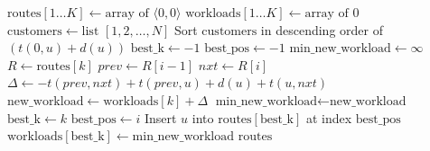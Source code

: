\documentclass[11pt]{article}
\begin{document}
\begin{algorithm}[H]
\caption{\textbf{Greedy Algorithm}}\label{alg:sorted_insertion}
\begin{algorithmic}[1]
    \State $\text{routes}[1 \dots K] \gets \text{array of } \langle 0, 0 \rangle$
    \State $\text{workloads}[1 \dots K] \gets \text{array of } 0$
    \State $\text{customers} \gets \text{list } [1, 2, \dots, N]$
    \State Sort $\text{customers}$ in descending order of $\left( t(0, u) + d(u) \right)$
        \State $\text{best\_k} \gets -1$
        \State $\text{best\_pos} \gets -1$
        \State $\text{min\_new\_workload} \gets \infty$
            $R \gets \text{routes}[k]$
                \State $prev \gets R[i-1]$
                \State $nxt \gets R[i]$
                \State $\Delta \gets - t(prev, nxt) + t(prev, u) + d(u) + t(u, nxt)$
                \State $\text{new\_workload} \gets \text{workloads}[k] + \Delta$
                    \State $\text{min\_new\_workload} \gets \text{new\_workload}$
                    \State $\text{best\_k} \gets k$
                    \State $\text{best\_pos} \gets i$
                \EndIf
            \EndFor
        \EndFor
        \State Insert $u$ into $\text{routes}[\text{best\_k}]$ at index $\text{best\_pos}$
        \State $\text{workloads}[\text{best\_k}] \gets \text{min\_new\_workload}$
    \EndFor
    \State \Return $\text{routes}$
\EndProcedure
\end{algorithmic}
\end{algorithm}
\end{document}
